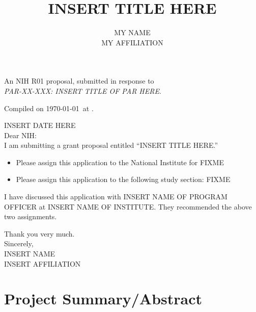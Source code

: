 \documentclass[11pt]{article}
\title{INSERT TITLE HERE}
\author{MY NAME\\
MY AFFILIATION}
\begin{document}
\maketitle

\begin{center}
An NIH R01 proposal, submitted in response to \\
{\em PAR-XX-XXX: INSERT TITLE OF PAR HERE}.
\end{center}

\vfill

{\scriptsize Compiled on \today\ at \currenttime.}

\clearpage

\noindent
INSERT DATE HERE\\[2ex]

\noindent
Dear NIH:\\[1ex]

I am submitting a grant proposal entitled ``INSERT TITLE HERE.''

\begin{itemize}
\item Please assign this application to the National Institute for
  FIXME
\item Please assign this application to the following study section:
  FIXME
\end{itemize}
I have discussed this application with INSERT NAME OF PROGRAM OFFICER
at INSERT NAME OF INSTITUTE.  They recommended the above two
assignments.

Thank you very much.\\[1ex]

\noindent
Sincerely,\\[2ex]

\noindent
INSERT NAME\\
INSERT AFFILIATION


\clearpage
\section*{Project Summary/Abstract}
\end{document}
